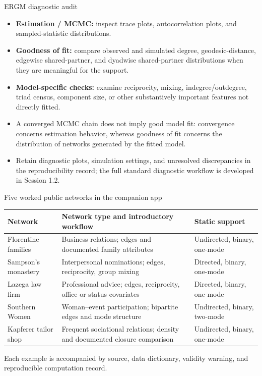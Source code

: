 \documentclass[aspectratio=169,11pt]{beamer}
\newcommand{\term}[1]{\textbf{\color{nupurple}#1}}
\begin{document}
\begin{frame}{ERGM diagnostic audit}
\begin{itemize}
\item \term{Estimation / MCMC:} inspect trace plots, autocorrelation plots, and sampled-statistic distributions.
\item \term{Goodness of fit:} compare observed and simulated degree, geodesic-distance, edgewise shared-partner, and dyadwise shared-partner distributions when they are meaningful for the support.
\item \term{Model-specific checks:} examine reciprocity, mixing, indegree/outdegree, triad census, component size, or other substantively important features not directly fitted.
\item A converged MCMC chain does not imply good model fit: convergence concerns estimation behavior, whereas goodness of fit concerns the distribution of networks generated by the fitted model.
\item Retain diagnostic plots, simulation settings, and unresolved discrepancies in the reproducibility record; the full standard diagnostic workflow is developed in Session 1.2.
\end{itemize}
\end{frame}

\begin{frame}{Five worked public networks in the companion app}
\small
\begin{tabularx}{\linewidth}{@{}lXl@{}}
\toprule
\term{Network} & \term{Network type and introductory workflow} & \term{Static support}\\
\midrule
Florentine families & Business relations; edges and documented family attributes & Undirected, binary, one-mode\\
Sampson's monastery & Interpersonal nominations; edges, reciprocity, group mixing & Directed, binary, one-mode\\
Lazega law firm & Professional advice; edges, reciprocity, office or status covariates & Directed, binary, one-mode\\
Southern Women & Woman--event participation; bipartite edges and mode structure & Undirected, binary, two-mode\\
Kapferer tailor shop & Frequent sociational relations; density and documented closure comparison & Undirected, binary, one-mode\\
\bottomrule
\end{tabularx}
\vspace{3pt}
Each example is accompanied by source, data dictionary, validity warning, and reproducible computation record.
\end{frame}
\end{document}
